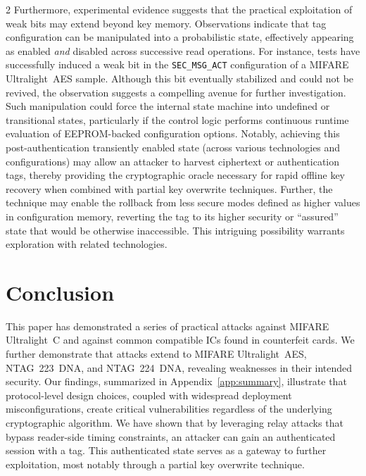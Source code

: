 \documentclass[10pt,letterpaper]{article}
\begin{document}
\begin{multicols}{2}
Furthermore, experimental evidence suggests that the practical exploitation of weak bits may extend beyond key memory. Observations indicate that tag configuration can be manipulated into a probabilistic state, effectively appearing as enabled \emph{and} disabled across successive read operations. For instance, tests have successfully induced a weak bit in the \texttt{SEC\_MSG\_ACT} configuration of a MIFARE Ultralight~AES sample. Although this bit eventually stabilized and could not be revived, the observation suggests a compelling avenue for further investigation. Such manipulation could force the internal state machine into undefined or transitional states, particularly if the control logic performs continuous runtime evaluation of EEPROM-backed configuration options. Notably, achieving this post-authentication transiently enabled state (across various technologies and configurations) may allow an attacker to harvest ciphertext or authentication tags, thereby providing the cryptographic oracle necessary for rapid offline key recovery when combined with partial key overwrite techniques.
Further, the technique may enable the rollback from less secure modes defined as higher values in configuration memory, reverting the tag to its higher security or ``assured'' state that would be otherwise inaccessible. This intriguing possibility warrants exploration with related technologies.

\section{Conclusion}
\label{sec:conclusion}
This paper has demonstrated a series of practical attacks against MIFARE Ultralight~C and against common compatible ICs found in counterfeit cards. We further demonstrate that attacks extend to MIFARE Ultralight~AES, NTAG~223~DNA, and NTAG~224~DNA, revealing weaknesses in their intended security. Our findings, summarized in Appendix~\ref{app:summary}, illustrate that protocol-level design choices, coupled with widespread deployment misconfigurations, create critical vulnerabilities regardless of the underlying cryptographic algorithm. We have shown that by leveraging relay attacks that bypass reader-side timing constraints, an attacker can gain an authenticated session with a tag. This authenticated state serves as a gateway to further exploitation, most notably through a partial key overwrite technique.


\end{multicols}
\end{document}
